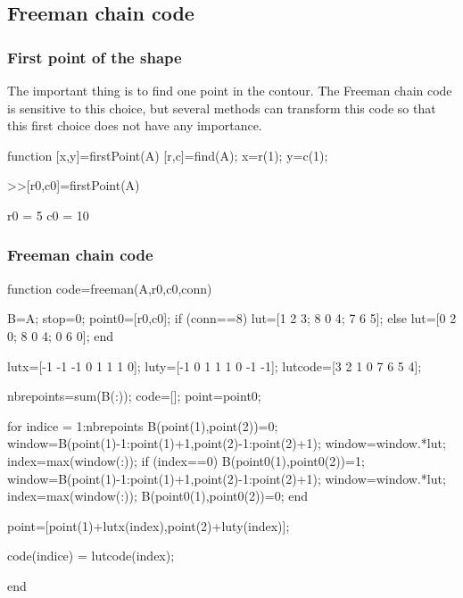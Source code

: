 \subsection{Freeman chain code}
\subsubsection{First point of the shape}
The important thing is to find one point in the contour. The Freeman chain code is sensitive to this choice, but several methods can transform this code so that this first choice does not have any importance.

\begin{matlab}
function [x,y]=firstPoint(A)
[r,c]=find(A);
x=r(1); y=c(1);
\end{matlab}

\begin{mwindow}
>>[r0,c0]=firstPoint(A)

r0 =
     5
c0 =
    10
\end{mwindow}

\subsubsection{Freeman chain code}
\begin{matlab}
function code=freeman(A,r0,c0,conn)

B=A;
stop=0; %
point0=[r0,c0];
if (conn==8)
    lut=[1 2 3; 8 0 4; 7 6 5];
else
    lut=[0 2 0; 8 0 4; 0 6 0];
end

%
lutx=[-1 -1 -1 0 1 1 1 0];
luty=[-1 0 1 1 1 0 -1 -1];
lutcode=[3 2 1 0 7 6 5 4];

nbrepoints=sum(B(:));
code=[];
point=point0;

for indice = 1:nbrepoints
    B(point(1),point(2))=0;
    window=B(point(1)-1:point(1)+1,point(2)-1:point(2)+1);
    window=window.*lut;
    index=max(window(:));
    if (index==0) %
        B(point0(1),point0(2))=1;
        window=B(point(1)-1:point(1)+1,point(2)-1:point(2)+1);
        window=window.*lut;
        index=max(window(:));
        B(point0(1),point0(2))=0;
    end
    
    point=[point(1)+lutx(index),point(2)+luty(index)];
    
    code(indice) = lutcode(index);
    
end
\end{matlab}


